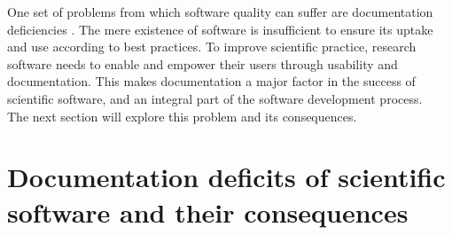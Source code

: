One set of problems from which software quality can suffer are documentation deficiencies \citep{mehlenbacher2003documentation}.
The mere existence of software is insufficient to ensure its uptake and use according to best practices.
To improve scientific practice, research software needs to enable and empower their users through usability and documentation.
This makes documentation a major factor in the success of scientific software, and an integral part of the software development process.\\
The next section will explore this problem and its consequences.


\section{Documentation deficits of scientific software and their consequences}


